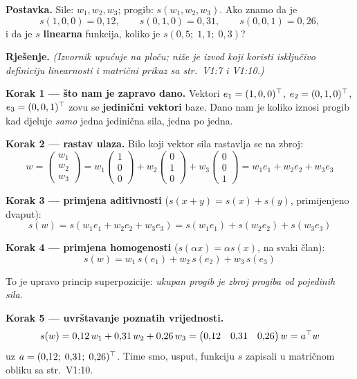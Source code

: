 \begin{zadatak}

\textbf{Postavka.} Sile: $w_1, w_2, w_3$; progib: $s(w_1, w_2, w_3)$. Ako
znamo da je
\[
s(1, 0, 0) = 0{,}12, \qquad s(0, 1, 0) = 0{,}31, \qquad s(0, 0, 1) = 0{,}26,
\]
i da je $s$ \textbf{linearna} funkcija, koliko je $s(0{,}5;\; 1{,}1;\; 0{,}3)$?

\medskip
\textbf{Rješenje.} \emph{(Izvornik upućuje na ploču; niže je izvod koji koristi
isključivo definiciju linearnosti i matrični prikaz sa str.\ V1:7 i V1:10.)}

\textbf{Korak 1 --- što nam je zapravo dano.} Vektori
$e_1 = (1,0,0)^{\top}$, $e_2 = (0,1,0)^{\top}$, $e_3 = (0,0,1)^{\top}$ zovu se
\textbf{jedinični vektori} baze. Dano nam je koliko iznosi progib kad djeluje
\emph{samo} jedna jedinična sila, jedna po jedna.

\textbf{Korak 2 --- rastav ulaza.} Bilo koji vektor sila rastavlja se na
zbroj:
\[
w = \begin{pmatrix} w_1 \\ w_2 \\ w_3 \end{pmatrix}
= w_1\begin{pmatrix}1\\0\\0\end{pmatrix}
+ w_2\begin{pmatrix}0\\1\\0\end{pmatrix}
+ w_3\begin{pmatrix}0\\0\\1\end{pmatrix}
= w_1 e_1 + w_2 e_2 + w_3 e_3
\]

\textbf{Korak 3 --- primjena aditivnosti} ($s(x+y) = s(x)+s(y)$, primijenjeno
dvaput):
\[
s(w) = s(w_1 e_1 + w_2 e_2 + w_3 e_3)
     = s(w_1 e_1) + s(w_2 e_2) + s(w_3 e_3)
\]

\textbf{Korak 4 --- primjena homogenosti} ($s(\alpha x) = \alpha s(x)$, na
svaki član):
\[
s(w) = w_1\,s(e_1) + w_2\,s(e_2) + w_3\,s(e_3)
\]

To je upravo princip superpozicije: \emph{ukupan progib je zbroj progiba od
pojedinih sila}.

\textbf{Korak 5 --- uvrštavanje poznatih vrijednosti.}
\[
s(w) = 0{,}12\,w_1 + 0{,}31\,w_2 + 0{,}26\,w_3
     = \begin{pmatrix} 0{,}12 & 0{,}31 & 0{,}26 \end{pmatrix} w
     = a^{\top} w
\]
uz $a = (0{,}12;\; 0{,}31;\; 0{,}26)^{\top}$. Time smo, usput, funkciju $s$ zapisali
u matričnom obliku sa str.\ V1:10.


\end{zadatak}
